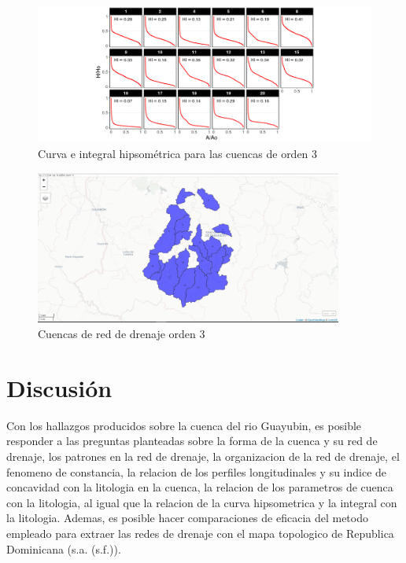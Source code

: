 \documentclass[11pt,]{article}
\begin{document}
\begin{figure}
\centering
\includegraphics[width=1.00000\textwidth]{HypsoBasinOrder3.png}
\caption{Curva e integral hipsométrica para las cuencas de orden
3\label{hysob3}}
\end{figure}

\begin{figure}
\centering
\includegraphics[width=0.90000\textwidth]{Mapview_hypsobasinorder3.png}
\caption{Cuencas de red de drenaje orden 3\label{hypb3}}
\end{figure}

\section{Discusión}\label{discusiuxf3n}

Con los hallazgos producidos sobre la cuenca del rio Guayubin, es
posible responder a las preguntas planteadas sobre la forma de la cuenca
y su red de drenaje, los patrones en la red de drenaje, la organizacion
de la red de drenaje, el fenomeno de constancia, la relacion de los
perfiles longitudinales y su indice de concavidad con la litologia en la
cuenca, la relacion de los parametros de cuenca con la litologia, al
igual que la relacion de la curva hipsometrica y la integral con la
litologia. Ademas, es posible hacer comparaciones de eficacia del metodo
empleado para extraer las redes de drenaje con el mapa topologico de
Republica Dominicana (s.a. (s.f.)).
\end{document}

